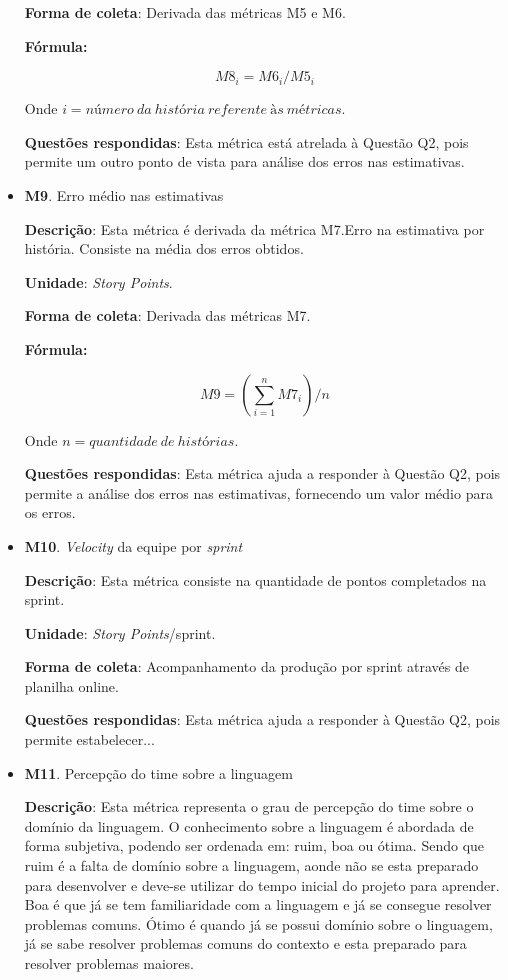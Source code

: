 \begin{itemize}
	   \subitem \textbf{Forma de coleta}: Derivada das métricas M5 e M6.
	   
	      \subsubitem \textbf{Fórmula:} 
	      
		$$ M8_i = M6_i / M5_i $$
		
	      \subsubitem Onde $i = número\ da\ história\ referente\ às\ métricas$.
	   
	   \subitem \textbf{Questões respondidas}: Esta métrica está atrelada à Questão Q2, pois permite um outro ponto de vista
		    para análise dos erros nas estimativas.
	 
	 \item \textbf{M9}. Erro médio nas estimativas
	   
	   \subitem \textbf{Descrição}: Esta métrica é derivada da métrica M7.Erro na estimativa por história.
		    Consiste na média dos erros obtidos.
	   
	   \subitem \textbf{Unidade}: \textit{Story Points}.
	   
	   \subitem \textbf{Forma de coleta}: Derivada das métricas M7.
	   
	      \subsubitem \textbf{Fórmula:} 
	      
		$$ M9 = (\sum\limits_{i=1}^{n}M7_i)/n $$
		
	      \subsubitem Onde $n = quantidade\ de\ histórias$.
	   
	   \subitem \textbf{Questões respondidas}: Esta métrica ajuda a responder à Questão Q2, pois permite a análise 
		    dos erros nas estimativas, fornecendo um valor médio para os erros.
		    
	 \item \textbf{M10}. \textit{Velocity} da equipe por \textit{sprint}
	   
	   \subitem \textbf{Descrição}: Esta métrica consiste na quantidade de pontos completados na sprint.
	   
	   \subitem \textbf{Unidade}: \textit{Story Points}/sprint.
	   
	   \subitem \textbf{Forma de coleta}: Acompanhamento da produção por sprint através de planilha online.
	   
	   \subitem \textbf{Questões respondidas}: Esta métrica ajuda a responder à Questão Q2, pois permite estabelecer...
	 
	 \item \textbf{M11}. Percepção do time sobre a linguagem
	 
	 	\subitem \textbf{Descrição}: Esta métrica representa o grau de percepção do time sobre o domínio da
	 	 linguagem. O conhecimento sobre a linguagem é abordada de forma subjetiva, podendo ser ordenada em: ruim,
	 	  boa ou ótima. Sendo que ruim é a falta de domínio sobre a linguagem, aonde não se esta preparado para
	 	   desenvolver e deve-se utilizar do tempo inicial do projeto para aprender. Boa é que já se tem
	 	    familiaridade com a linguagem e já se consegue resolver problemas comuns. Ótimo é quando já se possui 
	 	    domínio sobre o linguagem, já se sabe resolver problemas comuns do contexto e esta preparado para 
	 	    resolver problemas maiores.
	   

\end{itemize}
